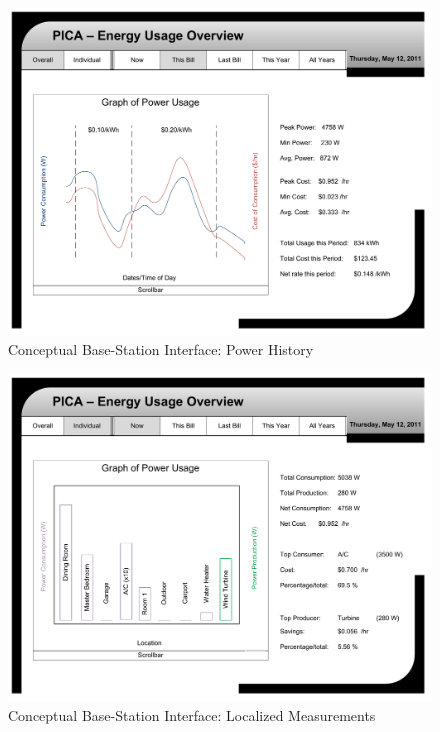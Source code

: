 \begin{figure}[htbp]
  \begin{center}
  \includegraphics[angle=90,width=6.5in]{includes/base_ui_mockup_recent}
  \caption{Conceptual Base-Station Interface: Power History}
  \label{fig:ui_mockup_history}
\end{center}
\end{figure}


\begin{figure}[htbp]
  \begin{center}
  \includegraphics[angle=90,width=6.5in]{includes/base_ui_mockup_multiple}
  \caption{Conceptual Base-Station Interface: Localized Measurements}
  \label{fig:ui_mockup_localized}
\end{center}
\end{figure}


